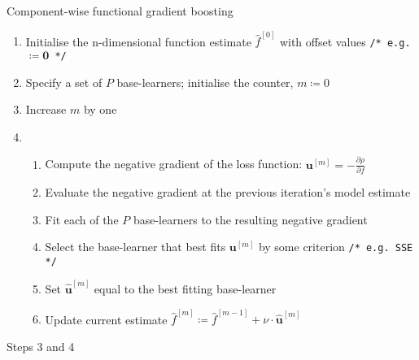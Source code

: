 \documentclass{article}
\begin{document}
\begin{algorithm}[H]
  \caption{Component-wise functional gradient boosting}
  \label{alg-comp-boosting}

  \BlankLine
  \BlankLine

  \KwIn{loss function, $\rho$; base-learners; counter, $m$; learning rate, $\nu \in [0,1)$}
  
  \BlankLine
  \BlankLine
  
  \begin{enumerate}[leftmargin=12.5mm]
  \item [Step 1.] Initialise the n-dimensional function estimate $\hat f^{[0]}$ with offset values\hspace{20pt} \texttt{/* e.g. $\coloneqq \mathbf{0}$ */}
  \item [Step 2.] Specify a set of $P$ base-learners; initialise the counter, $m \coloneqq 0$
  \item [Step 3.] Increase $m$ by one
  \item [Step 4.]
    \begin{enumerate}
    \item [a.] Compute the negative gradient of the loss function: $\mathbf{u}^{[m]} = - \frac{\partial \rho}{\partial f}$
    \item [b.] Evaluate the negative gradient at the previous iteration's model estimate
    \item [c.] Fit each of the $P$ base-learners to the resulting negative gradient
    \item [d.] Select the base-learner that best fits
      $\mathbf{u}^{[m]}$ by some criterion \hspace{35pt} \texttt{/* e.g. SSE */}
    \item [e.] Set $\mathbf{\hat u}^{[m]}$ equal to the best fitting base-learner
    \item [f.] Update current estimate $\hat f^{[m]} \coloneqq \hat
      f^{[m-1]} + \nu \cdot \mathbf{\hat u}^{[m]}$
    \end{enumerate}
  \end{enumerate}

   {
    \BlankLine
    Steps 3 and 4
    \BlankLine
  }
  \BlankLine
  \BlankLine
\end{algorithm}

\vspace{5mm}
\end{document}
